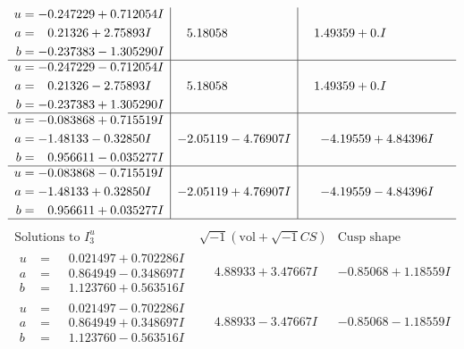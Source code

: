 \documentclass[1p]{elsarticle_modified}
\theoremstyle{definition}
\newcommand{\I}{\sqrt{-1}}
\begin{document}
$$\begin{array}{c|c|c}
\begin{aligned}
u &= -0.247229 + 0.712054 I \\
a &= \phantom{-}0.21326 + 2.75893 I \\
b &= -0.237383 - 1.305290 I\end{aligned}
 & \phantom{-}5.18058\phantom{ +0.000000I} & \phantom{-}1.49359 + 0. I\phantom{ +0.000000I} \\ \hline\begin{aligned}
u &= -0.247229 - 0.712054 I \\
a &= \phantom{-}0.21326 - 2.75893 I \\
b &= -0.237383 + 1.305290 I\end{aligned}
 & \phantom{-}5.18058\phantom{ +0.000000I} & \phantom{-}1.49359 + 0. I\phantom{ +0.000000I} \\ \hline\begin{aligned}
u &= -0.083868 + 0.715519 I \\
a &= -1.48133 - 0.32850 I \\
b &= \phantom{-}0.956611 - 0.035277 I\end{aligned}
 & -2.05119 - 4.76907 I & -4.19559 + 4.84396 I \\ \hline\begin{aligned}
u &= -0.083868 - 0.715519 I \\
a &= -1.48133 + 0.32850 I \\
b &= \phantom{-}0.956611 + 0.035277 I\end{aligned}
 & -2.05119 + 4.76907 I & -4.19559 - 4.84396 I\\
 \hline 
 \end{array}$$\newpage$$\begin{array}{c|c|c}  
\text{Solutions to }I^u_{3}& \I (\text{vol} + \sqrt{-1}CS) & \text{Cusp shape}\\
 \hline 
\begin{aligned}
u &= \phantom{-}0.021497 + 0.702286 I \\
a &= \phantom{-}0.864949 - 0.348697 I \\
b &= \phantom{-}1.123760 + 0.563516 I\end{aligned}
 & \phantom{-}4.88933 + 3.47667 I & -0.85068 + 1.18559 I \\ \hline\begin{aligned}
u &= \phantom{-}0.021497 - 0.702286 I \\
a &= \phantom{-}0.864949 + 0.348697 I \\
b &= \phantom{-}1.123760 - 0.563516 I\end{aligned}
 & \phantom{-}4.88933 - 3.47667 I & -0.85068 - 1.18559 I \\ \hline\begin{aligned}

\end{aligned}
\end{array}$$
\end{document}
